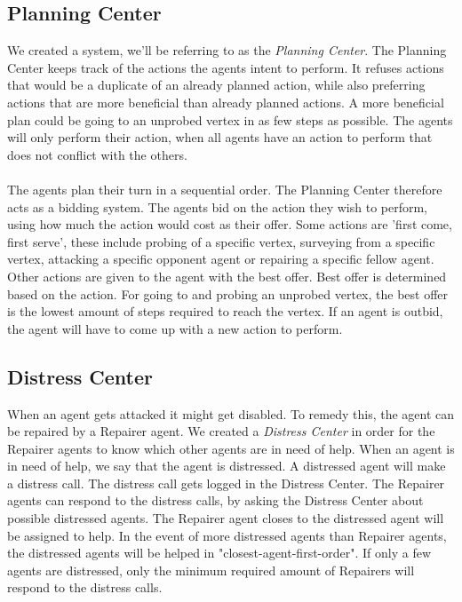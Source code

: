 \documentclass[11pt]{article}
\begin{document}
\subsection{Planning Center}
We created a system, we'll be referring to as the \emph{Planning Center}. The Planning Center keeps track of the actions the agents intent to perform. It refuses actions that would be a duplicate of an already planned action, while also preferring actions that are more beneficial than already planned actions. A more beneficial plan could be going to an unprobed vertex in as few steps as possible. The agents will only perform their action, when all agents have an action to perform that does not conflict with the others.\\
\\
The agents plan their turn in a sequential order. The Planning Center therefore acts as a bidding system. The agents bid on the action they wish to perform, using how much the action would cost as their offer. Some actions are 'first come, first serve', these include probing of a specific vertex, surveying from a specific vertex, attacking a specific opponent agent or repairing a specific fellow agent. Other actions are given to the agent with the best offer. Best offer is determined based on the action. For going to and probing an unprobed vertex, the best offer is the lowest amount of steps required to reach the vertex. If an agent is outbid, the agent will have to come up with a new action to perform.

\subsection{Distress Center}
When an agent gets attacked it might get disabled. To remedy this, the agent can be repaired by a Repairer agent. We created a \emph{Distress Center} in order for the Repairer agents to know which other agents are in need of help. When an agent is in need of help, we say that the agent is distressed. A distressed agent will make a distress call. The distress call gets logged in the Distress Center. The Repairer agents can respond to the distress calls, by asking the Distress Center about possible distressed agents. The Repairer agent closes to the distressed agent will be assigned to help. In the event of more distressed agents than Repairer agents, the distressed agents will be helped in "closest-agent-first-order". If only a few agents are distressed, only the minimum required amount of Repairers will respond to the distress calls.
\end{document}

